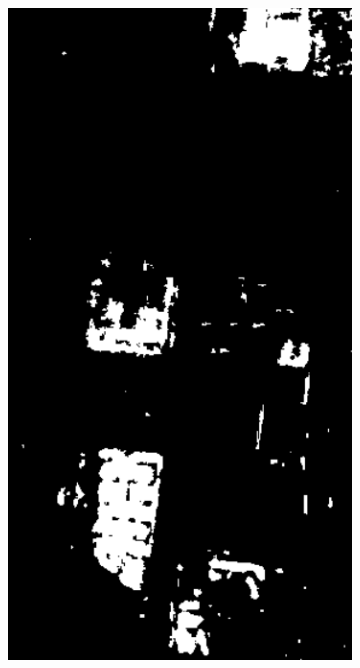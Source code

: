 \begin{figure}[t]
\begin{subfigure}[b]{0.23\columnwidth}
		\includegraphics[width=\textwidth]{Figures/CD/REF_A2}
		\caption{}
		\label{fig:3_c}
\end{subfigure}
\hspace{0.01pt}
\begin{subfigure}[b]{0.23\columnwidth}

\end{subfigure}
\end{figure}
